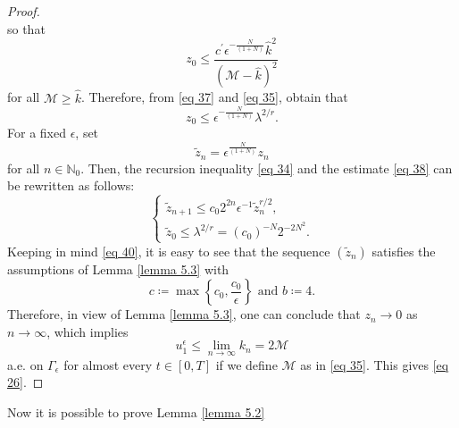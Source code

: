 \begin{proof}
\begin{equation}
\label{eq 36}
\end{equation}
so that
\begin{equation}
    z_{0} \leq \frac{c^{\prime} \epsilon^{-\frac{N}{(1+N)}} \hat{k}^{2}}{(\mathcal{M}-\hat{k})^{2}}
\label{eq 37}
\end{equation}
for all $\mathcal{M} \geq \hat{k}$. Therefore, from \eqref{eq 37} and \eqref{eq 35}, obtain that
\begin{equation}
    z_{0} \leq \epsilon^{-\frac{N}{(1+N)}} \lambda^{2 / r}.
\label{eq 38}
\end{equation}
For a fixed $\epsilon$, set
\begin{equation}
    \tilde{z}_{n}=\epsilon^{\frac{N}{(1+N)}} z_{n}
\label{eq 39}
\end{equation}
for all $n \in \mathbb{N}_{0}$. Then, the recursion inequality \eqref{eq 34} and the estimate \eqref{eq 38} can be rewritten as follows:
\begin{equation}
    \begin{cases}
        \tilde{z}_{n+1} \leq c_{0} 2^{2 n} \epsilon^{-1} \tilde{z}_{n}^{r / 2}, \\
        \tilde{z}_{0} \leq \lambda^{2 / r}=\left(c_{0}\right)^{-N} 2^{-2 N^{2}}.
    \end{cases}
\label{eq 40}
\end{equation}
Keeping in mind \eqref{eq 40}, it is easy to see that the sequence $\left(\tilde{z}_{n}\right)$ satisfies the assumptions of Lemma \eqref{lemma 5.3} with
$$
    c\coloneqq \max \left\{c_{0}, \frac{c_{0}}{\epsilon}\right\} \text { and } b\coloneqq 4.
$$
Therefore, in view of Lemma \eqref{lemma 5.3}, one can conclude that $z_{n} \rightarrow 0$ as $n \rightarrow \infty$, which implies
$$
    u_{1}^{\epsilon} \leq \lim _{n \rightarrow \infty} k_{n}=2 \mathcal{M}
$$
a.e. on $\Gamma_{\epsilon}$ for almost every $t \in[0, T]$ if we define $\mathcal{M}$ as in \eqref{eq 35}. This gives \eqref{eq 26}.
\end{proof}
Now it is possible to prove Lemma \eqref{lemma 5.2}
